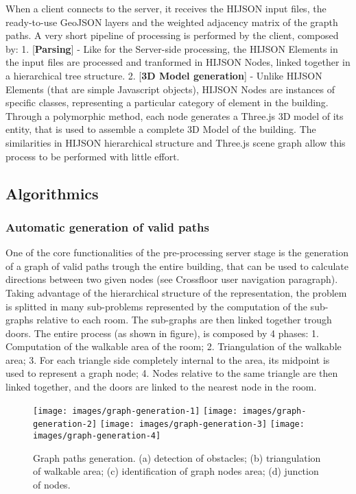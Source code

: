 \documentclass{sig-alternate}
\begin{document}
When a client connects to the server, it receives the HIJSON input
files, the ready-to-use GeoJSON layers and the weighted adjacency matrix
of the grapth paths. A very short pipeline of processing is performed by
the client, composed by: 1. {[}\textbf{Parsing}{]} - Like for the
Server-side processing, the HIJSON Elements in the input files are
processed and tranformed in HIJSON Nodes, linked together in a
hierarchical tree structure. 2. {[}\textbf{3D Model generation}{]} -
Unlike HIJSON Elements (that are simple Javascript objects), HIJSON
Nodes are instances of specific classes, representing a particular
category of element in the building. Through a polymorphic method, each
node generates a Three.js 3D model of its entity, that is used to
assemble a complete 3D Model of the building. The similarities in HIJSON
hierarchical structure and Three.js scene graph allow this process to be
performed with little effort.

\subsection{Algorithmics}\label{algorithmics}

\subsubsection{Automatic generation of valid
paths}\label{automatic-generation-of-valid-paths}

One of the core functionalities of the pre-processing server stage is
the generation of a graph of valid paths trough the entire building,
that can be used to calculate directions between two given nodes (see
Crossfloor user navigation paragraph). Taking advantage of the
hierarchical structure of the representation, the problem is splitted in
many sub-problems represented by the computation of the sub-graphs
relative to each room. The sub-graphs are then linked together trough
doors. The entire process (as shown in figure), is composed by 4 phases:
1. Computation of the walkable area of the room; 2. Triangulation of the
walkable area; 3. For each triangle side completely internal to the
area, its midpoint is used to represent a graph node; 4. Nodes relative
to the same triangle are then linked together, and the doors are linked
to the nearest node in the room.

\begin{figure*}[htbp] %
  \centering
  \texttt{[image: images/graph-generation-1]}
  \texttt{[image: images/graph-generation-2]}
  \texttt{[image: images/graph-generation-3]}
  \texttt{[image: images/graph-generation-4]}
  \caption{Graph paths generation. (a) detection of obstacles; (b) triangulation of walkable area; (c) identification of graph nodes area; (d) junction of nodes.}
  \label{fig:graph-generation}
\end{figure*}
\end{document}
